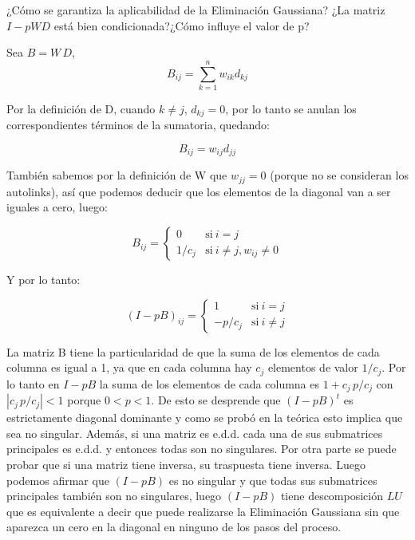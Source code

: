 ¿Cómo se garantiza la aplicabilidad de la Eliminación Gaussiana? ¿La matriz $I-pWD$ está bien condicionada?¿Cómo influye el valor de p?

Sea $B=W\,D$,
\begin{displaymath}
B_{ij}=\sum_{k=1}^n w_{ik}d_{kj}
\end{displaymath}

Por la definición de D, cuando $k\not=j$, $d_{kj}=0$, por lo tanto se anulan los correspondientes términos de la sumatoria, quedando:

\begin{displaymath}
B_{ij}=w_{ij}d_{jj}
\end{displaymath}

También sabemos por la definición de W que $w_{jj}=0$ (porque no se consideran los autolinks), así que podemos deducir que los elementos de la diagonal van a ser iguales a cero, luego:

\begin{equation}
 B_{ij} = \left\{
    \begin{array}{ll}
	 0 & \mathrm{si\ } i=j \\
	 1/c_j & \mathrm{si\ } i\not=j,  w_{ij}\not=0
	 \end{array}
   \right.
\end{equation}

Y por lo tanto:

\begin{equation}
(I-p B)_{ij} = \left\{
    \begin{array}{ll}
	 1 & \mathrm{si\ } i=j \\
	 -p/c_j & \mathrm{si\ } i\not=j
	 \end{array}
   \right.
\end{equation}

La matriz B tiene la particularidad de que la suma de los elementos de cada columna es igual a 1, ya que en cada columna hay $c_j$ elementos de valor $1/c_j$. Por lo tanto en $I-p B$ la suma de los elementos de cada columna es $1+c_j\, p/c_j$ con $|c_j\, p/c_j|<1$ porque $0<p<1$. De esto se desprende que $(I-p B)^t$ es estrictamente diagonal dominante y como se probó en la teórica esto implica que sea no singular. Además, si una matriz es e.d.d. cada una de sus submatrices principales es e.d.d. y entonces todas son no singulares. Por otra parte se puede probar que si una matriz tiene inversa, su traspuesta tiene inversa. Luego podemos afirmar que $(I-p B)$ es no singular y que todas sus submatrices principales también son no singulares, luego $(I-p B)$ tiene descomposición $LU$ que es equivalente a decir que puede realizarse la Eliminación Gaussiana sin que aparezca un cero en la diagonal en ninguno de los pasos del proceso.


